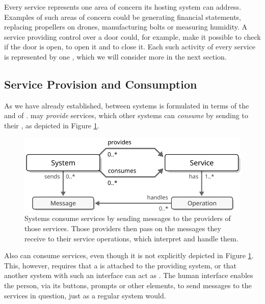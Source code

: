 \vfill

Every service represents one area of concern its hosting system can address.
Examples of such areas of concern could be generating financial statements, replacing propellers on drones, manufacturing bolts or measuring humidity.
A service providing control over a door could, for example, make it possible to check if the door is open, to open it and to close it.
Each such activity of every service is represented by one , which we will consider more in the next section.

\subsection{Service Provision and Consumption}

As we have already established,  between systems is formulated in terms of the  and  of .
 may \textit{provide} services, which other systems can \textit{consume} by sending  to their , as depicted in Figure \ref{fig:service-consumption}.

\vfill

\begin{figure}[ht!]
  \centering
  \includegraphics[scale=0.9]{figures/service-consumption}
  \caption{
    Systems consume services by sending messages to the providers of those services.
    Those providers then pass on the messages they receive to their service operations, which interpret and handle them.
  }
  \label{fig:service-consumption}
\end{figure}

\vfill

Also  can consume services, even though it is not explicitly depicted in Figure \ref{fig:service-consumption}.
This, however, requires that a  is attached to the providing system, or that another system with such an interface can act as .
The human interface enables the person, via its buttons, prompts or other elements, to send messages to the services in question, just as a regular system would.

